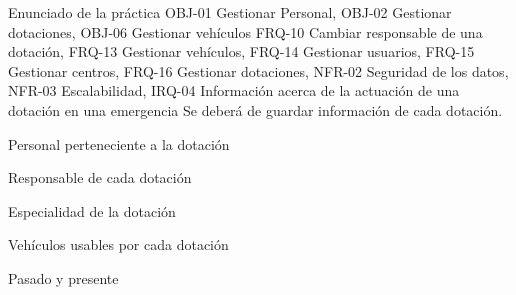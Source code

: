 {\reportauthors}
{Enunciado de la práctica}
{OBJ-01 Gestionar Personal, OBJ-02 Gestionar dotaciones, OBJ-06 Gestionar vehículos}
{FRQ-10 Cambiar responsable de una dotación, FRQ-13 Gestionar vehículos, FRQ-14 Gestionar usuarios, FRQ-15 Gestionar centros, FRQ-16 Gestionar dotaciones, NFR-02 Seguridad de los datos, NFR-03 Escalabilidad, IRQ-04 Información acerca de la actuación de una dotación en una emergencia}
{Se deberá de guardar información de cada dotación.}
{
\item{Personal perteneciente a la dotación}
\item{Responsable de cada dotación}
\item{Especialidad de la dotación}
\item{Vehículos usables por cada dotación}
}
{Pasado y presente}

